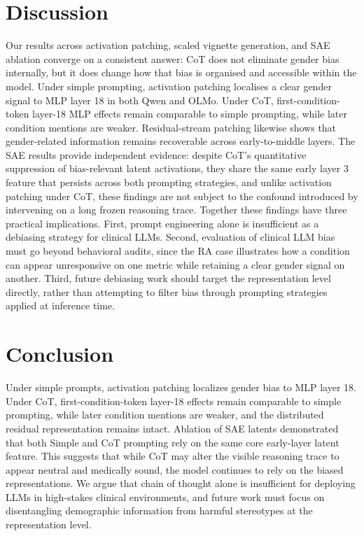 \documentclass[11pt]{article}
\begin{document}
\section{Discussion}
Our results across activation patching, scaled vignette generation, and SAE ablation converge on a consistent answer: CoT does not eliminate gender bias internally, but it does change how that bias is organised and accessible within the model. Under simple prompting, activation patching localises a clear gender signal to MLP layer 18 in both Qwen and OLMo. Under CoT, first-condition-token layer-18 MLP effects remain comparable to simple prompting, while later condition mentions are weaker. Residual-stream patching likewise shows that gender-related information remains recoverable across early-to-middle layers. The SAE results provide independent evidence: despite CoT's quantitative suppression of bias-relevant latent activations, they share the same early layer 3 feature that persists across both prompting strategies, and unlike activation patching under CoT, these findings are not subject to the confound introduced by intervening on a long frozen reasoning trace. Together these findings have three practical implications. First, prompt engineering alone is insufficient as a debiasing strategy for clinical LLMs. Second, evaluation of clinical LLM bias must go beyond behavioral audits, since the RA case illustrates how a condition can appear unresponsive on one metric while retaining a clear gender signal on another. Third, future debiasing work should target the representation level directly, rather than attempting to filter bias through prompting strategies applied at inference time.

\section{Conclusion}
Under simple prompts, activation patching localizes gender bias to MLP layer 18. Under CoT, first-condition-token layer-18 effects remain comparable to simple prompting, while later condition mentions are weaker, and the distributed residual representation remains intact. Ablation of SAE latents demonstrated that both Simple and CoT prompting rely on the same core early-layer latent feature. This suggests that while CoT may alter the visible reasoning trace to appear neutral and medically sound, the model continues to rely on the biased representations. We argue that chain of thought alone is insufficient for deploying LLMs in high-stakes clinical environments, and future work must focus on disentangling demographic information from harmful stereotypes at the representation level.
\end{document}
